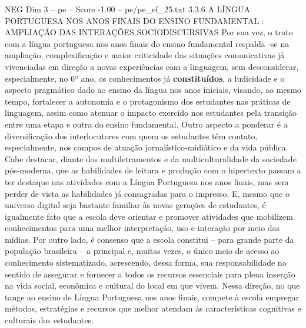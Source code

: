 \begin{textsample}{NEG Dim 3 – pe – Score -1.00 – pe/pe\_ef\_25.txt}  \label{ex:f3_neg_002}
3.3.6 A LÍNGUA PORTUGUESA NOS ANOS FINAIS DO ENSINO FUNDAMENTAL : AMPLIAÇÃO DAS INTERAÇÕES SOCIODISCURSIVAS Por sua vez, o trato com a língua portuguesa nos anos finais do ensino fundamental respalda -se na ampliação, complexificação e maior criticidade das situações comunicativas já vivenciadas em direção a novas experiências com a linguagem, sem desconsiderar, especialmente, no 6º ano, os conhecimentos já \textbf{constituídos}, a ludicidade e o aspecto pragmático dado ao ensino da língua nos anos iniciais, visando, ao mesmo tempo, fortalecer a autonomia e o protagonismo dos estudantes nas práticas de linguagem, assim como atenuar o impacto exercido nos estudantes pela transição entre uma etapa e outra do ensino fundamental.
Outro aspecto a ponderar é a diversificação dos interlocutores com quem os estudantes têm contato, especialmente, nos campos de atuação jornalístico-midiático e da vida pública.
Cabe destacar, diante dos multiletramentos e da multiculturalidade da sociedade pós-moderna, que as habilidades de leitura e produção com o hipertexto passam a ter destaque nas atividades com a Língua Portuguesa nos anos finais, mas sem perder de vista as habilidades já consagradas para o impresso.
E, mesmo que o universo digital seja bastante familiar às novas gerações de estudantes, é igualmente fato que a escola deve orientar e promover atividades que mobilizem conhecimentos para uma melhor interpretação, uso e interação por meio das mídias.
Por outro lado, é consenso que a escola constitui – para grande parte da população brasileira – a principal e, muitas vezes, o único meio de acesso ao conhecimento sistematizado, acrescendo, dessa forma, sua responsabilidade no sentido de assegurar e fornecer a todos os recursos essenciais para plena inserção na vida social, econômica e cultural do local em que vivem.
Nessa direção, no que tange ao ensino de Língua Portuguesa nos anos finais, compete à escola empregar métodos, estratégias e recursos que melhor atendam às características cognitivas e culturais dos estudantes.

\end{textsample}
